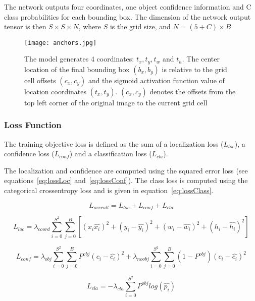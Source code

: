 The network outputs four coordinates, one object confidence information and C class probabilities for each bounding box. The dimension of the network output tensor is then $S \times S \times N$, where $S$ is the grid size, and $N = (5 + C) \times B$

\begin{figure}
  \centering
  \texttt{[image: anchors.jpg]}
	\caption[Anchors and location predictions]{The model generates 4 coordinates: $t_x, t_y, t_w$ and $t_h$. The center location of the final bounding box $(b_x, b_y)$ is relative to the grid cell offsets $(c_x, c_y)$ and the sigmoid activation function value of location coordinates $(t_x, t_y)$. $(c_x, c_y)$ denotes the offsets from the top left corner of the original image to the current grid cell}
  \label{}
\end{figure}
\subsubsection{Loss Function}
The training objective loss is defined as the sum of a localization loss ($L_{loc}$), a confidence loss ($L_{conf}$) and a classification loss ($L_{cla}$). 

The localization and confidence are computed using the squared error loss (see equations~\ref{eq:lossLoc} and~\ref{eq:lossConf}). The class loss is computed using the categorical crossentropy loss and is given in equation~\ref{eq:lossClass}.

\begin{equation}
	L_{overall} = L_{loc} + L_{conf} + L_{cla}
\end{equation}

\begin{equation}\label{eq:lossLoc}
	L_{loc} = \lambda_{coord} \sum_{i=0}^{S^2} \sum_{j=0}^B [(x_i \hat{x_i})^2 + (y_i - \hat{y_i})^2 + (w_i - \hat{w_i})^2 + (h_i - \hat{h_i})^2]
\end{equation}

\begin{equation}\label{eq:lossConf}
	L_{conf} = \lambda_{obj}  \sum_{i=0}^{S^2} \sum_{j=0}^B P^{obj} (c_i - \hat{c_i})^2 + \lambda_{noobj} \sum_{i=0}^{S^2} \sum_{j=0}^B (1 - P^{obj}) (c_i - \hat{c_i})^2   
\end{equation}

\begin{equation}\label{eq:lossClass}
	L_{cla} = -\lambda_{cla} \sum_{i=0}^{S^2} P^{obj} log(\hat{p_i})
\end{equation}

